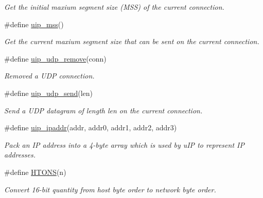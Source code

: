 \begin{CompactItemize}
\begin{CompactList}\small\item\em Get the initial maxium segment size (MSS) of the current connection. \item\end{CompactList}\item 
\#define \hyperlink{a00064_gb5fecbc62edd128012cea0f47b57ab9f}{uip\_\-mss}()
\begin{CompactList}\small\item\em Get the current maxium segment size that can be sent on the current connection. \item\end{CompactList}\item 
\#define \hyperlink{a00064_gf2dbaceb10c67783a115075b5b6d66df}{uip\_\-udp\_\-remove}(conn)
\begin{CompactList}\small\item\em Removed a UDP connection. \item\end{CompactList}\item 
\#define \hyperlink{a00064_ge5ab69d40013e6cf86ef1763c95d920e}{uip\_\-udp\_\-send}(len)
\begin{CompactList}\small\item\em Send a UDP datagram of length len on the current connection. \item\end{CompactList}\item 
\#define \hyperlink{a00065_g87f0b54ade0d159fba495089128a4932}{uip\_\-ipaddr}(addr, addr0, addr1, addr2, addr3)
\begin{CompactList}\small\item\em Pack an IP address into a 4-byte array which is used by u\-IP to represent IP addresses. \item\end{CompactList}\item 
\#define \hyperlink{a00065_g69a7a4951ff21b302267532c21ee78fc}{HTONS}(n)
\begin{CompactList}\small\item\em Convert 16-bit quantity from host byte order to network byte order. \item\end{CompactList}\end{CompactItemize}
